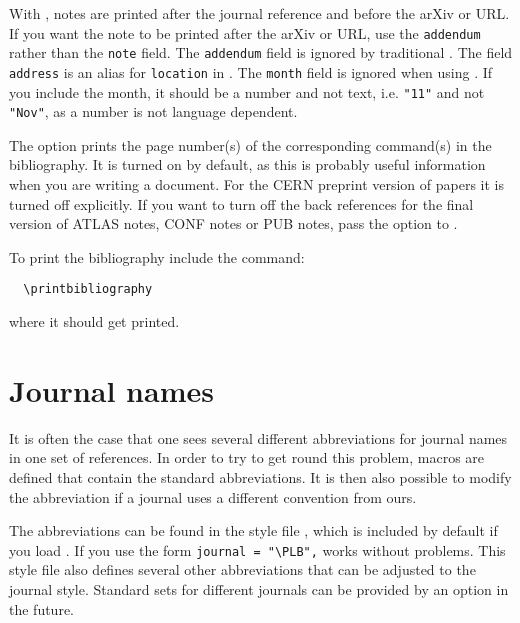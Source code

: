 \documentclass[UKenglish, texlive=2016]{atlasdoc}
\begin{document}
With , notes are printed after the journal reference and before the arXiv or URL.
If you want the note to be printed after the arXiv or URL, use the \texttt{addendum} rather than the \texttt{note} field.
The \texttt{addendum} field is ignored by traditional \BibTeX.
The field \texttt{address} is an alias for \texttt{location} in .
The \texttt{month} field is ignored when using .
If you include the month, it should be a number and not text,
i.e. \verb|"11"| and not \verb|"Nov"|,
as a number is not language dependent.

The  option prints the page number(s) of the corresponding  command(s)
in the bibliography.
It is turned on by default, as this is probably useful information
when you are writing a document.
For the CERN preprint version of papers it is turned off explicitly.
If you want to turn off the back references for the final version of ATLAS notes,
CONF notes or PUB notes, pass the option  to .

To print the bibliography include the command:
%
\begin{verbatim}
  \printbibliography
\end{verbatim}
%
where it should get printed.


\section{Journal names}

It is often the case that one sees several different abbreviations for journal
names in one set of references.
In order to try to get round this problem, macros are defined that
contain the standard abbreviations.
It is then also possible to modify the abbreviation if a journal uses a different convention from ours.

The abbreviations can be found in the style file ,
which is included by default if you load .
If you use  the form \verb|journal = "\PLB",| works without problems.
This style file also defines several other abbreviations that can be adjusted to the
journal style.
Standard sets for different journals can be provided by an option in the future.


\end{document}
